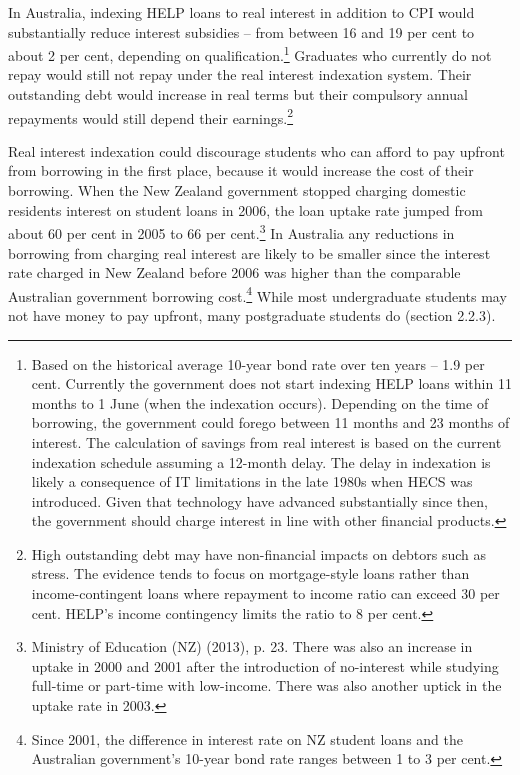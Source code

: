 \documentclass[embargoed]{grattan}
\begin{document}
In Australia, indexing HELP loans to real interest in addition to CPI would substantially reduce interest subsidies -- from between 16 and 19 per cent to about 2 per cent, depending on qualification.\protect\hypertarget{_Ref335647424}{}{}\footnote{Based on the historical average 10-year bond rate over ten years -- 1.9 per cent. Currently the government does not start indexing HELP loans within 11 months to 1 June (when the indexation occurs). Depending on the time of borrowing, the government could forego between 11 months and 23 months of interest. The calculation of savings from real interest is based on the current indexation schedule assuming a 12-month delay. The delay in indexation is likely a consequence of IT limitations in the late 1980s when HECS was introduced. Given that technology have advanced substantially since then, the government should charge interest in line with other financial products.} Graduates who currently do not repay would still not repay under the real interest indexation system. Their outstanding debt would increase in real terms but their compulsory annual repayments would still depend their earnings.\footnote{High outstanding debt may have non-financial impacts on debtors such as stress. The evidence tends to focus on mortgage-style loans rather than income-contingent loans where repayment to income ratio can exceed 30 per cent. HELP's income contingency limits the ratio to 8 per cent.}

Real interest indexation could discourage students who can afford to pay upfront from borrowing in the first place, because it would increase the cost of their borrowing. When the New Zealand government stopped charging domestic residents interest on student loans in 2006, the loan uptake rate jumped from about 60 per cent in 2005 to 66 per cent.\footnote{Ministry of Education (NZ) (2013), p. 23. There was also an increase in uptake in 2000 and 2001 after the introduction of no-interest while studying full-time or part-time with low-income. There was also another uptick in the uptake rate in 2003.} In Australia any reductions in borrowing from charging real interest are likely to be smaller since the interest rate charged in New Zealand before 2006 was higher than the comparable Australian government borrowing cost.\footnote{Since 2001, the difference in interest rate on NZ student loans and the Australian government's 10-year bond rate ranges between 1 to 3 per cent.} While most undergraduate students may not have money to pay upfront, many postgraduate students do (section 2.2.3).
\end{document}
